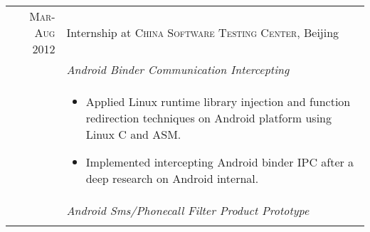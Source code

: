 \documentclass[a4paper,10pt]{article} %
\begin{document}
\begin{tabular}{r|p{11cm}}

\textsc{Mar-Aug 2012} & Internship at \textsc{China Software Testing Center}, Beijing \emph{}\smallskip\\
& \emph{Android Binder Communication Intercepting}\\
& \footnotesize{
\begin{itemize}
\item Applied Linux runtime library injection and function redirection techniques on Android platform using Linux C and ASM. 
\item Implemented intercepting Android binder IPC after a deep research on Android internal. 
\end{itemize}
}\\
& \emph{Android Sms/Phonecall Filter Product Prototype}\\
\multicolumn{2}{c}{} \\
\end{tabular}
\pagebreak
\end{document}
